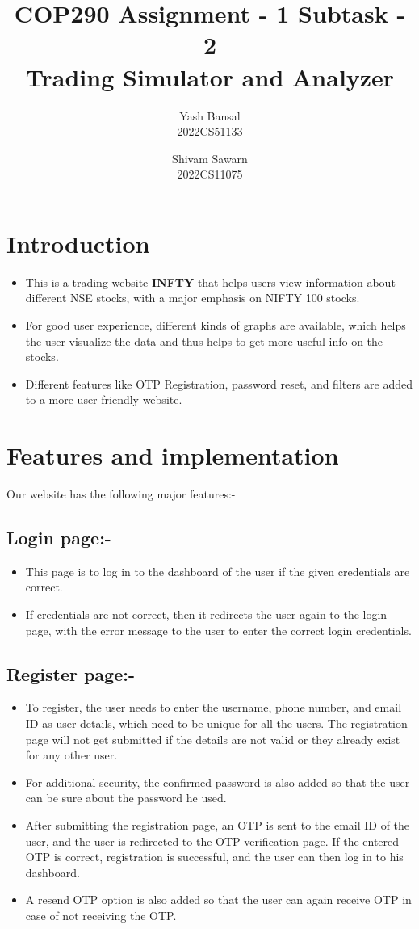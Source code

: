 \documentclass[11pt]{article}
\title{{\fontsize{21pt}{18pt}\selectfont COP290 Assignment - 1 Subtask - 2} \\ Trading Simulator and Analyzer}
\author{Yash Bansal \\ 2022CS51133 \and Shivam Sawarn \\ 2022CS11075}
\date{}
\begin{document}
\maketitle

\section{Introduction}

\begin{itemize}
    \item This is a trading website \textbf{INFTY} that helps users view information about different NSE stocks, with a major emphasis on NIFTY 100 stocks.
    \item For good user experience, different kinds of graphs are available, which helps the user visualize the data and thus helps to get more useful info on the stocks.
    \item Different features like OTP Registration, password reset, and filters are added to a more user-friendly website.
\end{itemize}

\section{Features and implementation}
Our website has the following major features:-

\subsection{Login page:-}
\begin{itemize}
    \item This page is to log in to the dashboard of the user if the given credentials are correct.
    \item If credentials are not correct, then it redirects the user again to the login page, with the error message to the user to enter the correct login credentials.
\end{itemize}

\subsection{Register page:-}
\begin{itemize}
    \item To register, the user needs to enter the username, phone number, and email ID as user details, which need to be unique for all the users. The registration page will not get submitted if the details are not valid or they already exist for any other user.
    \item For additional security, the confirmed password is also added so that the user can be sure about the password he used.
    \item After submitting the registration page, an OTP is sent to the email ID of the user, and the user is redirected to the OTP verification page. If the entered OTP is correct, registration is successful, and the user can then log in to his dashboard.
    \item A resend OTP option is also added so that the user can again receive OTP in case of not receiving the OTP.
\end{itemize}
\end{document}
